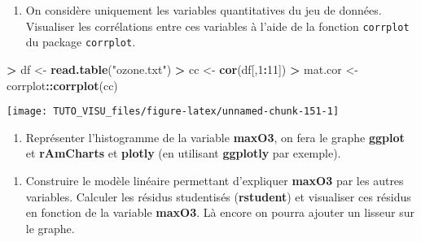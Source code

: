 \documentclass[]{article}
\newenvironment{Shaded}{\begin{snugshade}}{\end{snugshade}}
\newcommand{\DataTypeTok}[1]{\textcolor[rgb]{0.13,0.29,0.53}{#1}}
\newcommand{\DecValTok}[1]{\textcolor[rgb]{0.00,0.00,0.81}{#1}}
\newcommand{\KeywordTok}[1]{\textcolor[rgb]{0.13,0.29,0.53}{\textbf{#1}}}
\newcommand{\NormalTok}[1]{#1}
\newcommand{\OperatorTok}[1]{\textcolor[rgb]{0.81,0.36,0.00}{\textbf{#1}}}
\newcommand{\StringTok}[1]{\textcolor[rgb]{0.31,0.60,0.02}{#1}}
\providecommand{\tightlist}{%
  \setlength{\itemsep}{0pt}\setlength{\parskip}{0pt}}
\theoremstyle{definition}
\theoremstyle{definition}
\theoremstyle{definition}
\theoremstyle{remark}
\begin{document}
\begin{enumerate}
\def\labelenumi{\alph{enumi}.}
\tightlist
\item
  On considère uniquement les variables quantitatives du jeu de données. Visualiser les corrélations entre ces variables à l'aide de la fonction \texttt{corrplot} du package \texttt{corrplot}.
\end{enumerate}

\begin{Shaded}
\begin{Highlighting}[]
\OperatorTok{>}\StringTok{ }\NormalTok{df <-}\StringTok{ }\KeywordTok{read.table}\NormalTok{(}\StringTok{"ozone.txt"}\NormalTok{)}
\OperatorTok{>}\StringTok{ }\NormalTok{cc <-}\StringTok{ }\KeywordTok{cor}\NormalTok{(df[,}\DecValTok{1}\OperatorTok{:}\DecValTok{11}\NormalTok{])}
\OperatorTok{>}\StringTok{ }\NormalTok{mat.cor <-}\StringTok{ }\NormalTok{corrplot}\OperatorTok{::}\KeywordTok{corrplot}\NormalTok{(cc)}
\end{Highlighting}
\end{Shaded}

\begin{center}\texttt{[image: TUTO\_VISU\_files/figure-latex/unnamed-chunk-151-1]} \end{center}

\begin{enumerate}
\def\labelenumi{\alph{enumi}.}
\setcounter{enumi}{1}
\tightlist
\item
  Représenter l'histogramme de la variable \textbf{maxO3}, on fera le graphe \textbf{ggplot} et \textbf{rAmCharts} et \textbf{plotly} (en utilisant \textbf{ggplotly} par exemple).
\end{enumerate}

\begin{Shaded}
\end{Shaded}

\begin{enumerate}
\def\labelenumi{\alph{enumi}.}
\setcounter{enumi}{2}
\tightlist
\item
  Construire le modèle linéaire permettant d'expliquer \textbf{maxO3} par les autres variables. Calculer les résidus studentisés (\textbf{rstudent}) et visualiser ces résidus en fonction de la variable \textbf{maxO3}. Là encore on pourra ajouter un lisseur sur le graphe.
\end{enumerate}
\end{document}
